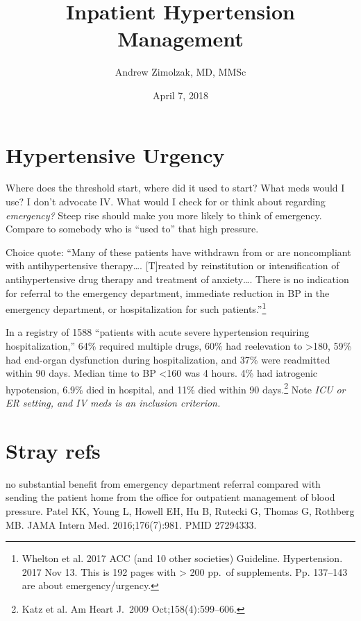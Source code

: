 \documentclass{tufte-handout}
\title{Inpatient Hypertension Management}
\author{Andrew Zimolzak, MD, MMSc}
\date{April 7, 2018}
\begin{document}
\maketitle



\section{Hypertensive Urgency}

Where does the threshold start, where did it used to start?
What meds would I use? I
don't advocate IV. What would I check for or think about regarding
\emph{emergency?} Steep rise should make you more likely to think of
emergency. Compare to somebody who is ``used to'' that high pressure.

Choice quote: ``Many of these
patients have withdrawn from or are noncompliant with antihypertensive therapy\ldots{}.
[T]reated by reinstitution or intensification of antihypertensive drug
therapy and treatment of anxiety\ldots{}. There is no indication for referral to the emergency
department, immediate reduction in BP in the emergency department, or hospitalization for such
patients.''\footnote{Whelton et al. 2017 ACC (and 10 other societies) Guideline. Hypertension. 2017 Nov 13. This is 192 pages with > 200 pp.\ of supplements. Pp. 137--143 are about emergency/urgency.}

In a registry of 1588 ``patients with acute severe hypertension requiring hospitalization,'' 64\% required multiple drugs, 60\% had reelevation to >180, 59\% had end-organ dysfunction during hospitalization, and 37\% were readmitted within 90 days. Median time to BP <160 was 4 hours. 4\% had iatrogenic hypotension, 6.9\% died in hospital, and 11\% died within 90 days.\footnote{Katz et al. Am Heart J.\ 2009 Oct;158(4):599--606.} Note \emph{ICU or ER setting, and IV meds is an inclusion criterion.}


\section{Stray refs}

no substantial benefit from emergency department referral compared with sending the patient home from the office for outpatient management of blood pressure. Patel KK, Young L, Howell EH, Hu B, Rutecki G, Thomas G, Rothberg MB. 
JAMA Intern Med. 2016;176(7):981. PMID
27294333.
\end{document}

